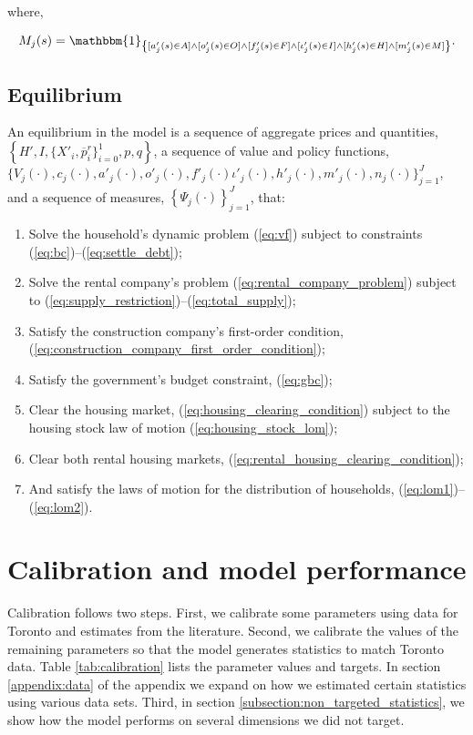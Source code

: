 \documentclass[parskip=full]{article}
\newcommand{\indicator}[1]{\mathbbm{1}_{\left\{ {#1} \right\} }}
\begin{document}
\noindent where,

\begin{align}
    M_{j}(s) = \indicator{[a'_{j}(s)\in A] \land [o'_{j}(s)\in O] \land [f'_{j}(s)\in F] \land [\iota'_{j}(s)\in I] \land [h'_{j}(s) \in H] \land [m'_{j}(s) \in M]}.\notag
\end{align}

\subsection{Equilibrium}
An equilibrium in the model is a sequence of aggregate prices and quantities, $\left\{H',I,\{X'_{i},\overline{p}^{r}_{i}\}^{1}_{i=0},p,q\right\}$, a sequence of value and policy functions, $\biggl\{V_{j}(\cdot),c_{j}(\cdot),a'_{j}(\cdot),o'_{j}(\cdot),f'_{j}(\cdot)\iota'_{j}(\cdot),h'_{j}(\cdot),m'_{j}(\cdot),n_{j}(\cdot)\biggl\}_{j=1}^J$, and a sequence of measures, $\left\{\Psi_{j}(\cdot)\right\}_{j=1}^J$, that:
\begin{enumerate}
\item Solve the household's dynamic problem (\ref{eq:vf}) subject to constraints (\ref{eq:bc})--(\ref{eq:settle_debt});
\item Solve the rental company's problem (\ref{eq:rental_company_problem}) subject to (\ref{eq:supply_restriction})--(\ref{eq:total_supply});
\item Satisfy the construction company's first-order condition, (\ref{eq:construction_company_first_order_condition});
\item Satisfy the government's budget constraint, (\ref{eq:gbc});
\item Clear the housing market,
(\ref{eq:housing_clearing_condition}) subject to the housing stock law of motion (\ref{eq:housing_stock_lom});
\item Clear both rental housing markets,
(\ref{eq:rental_housing_clearing_condition});
\item And satisfy the laws of motion for the distribution of households, (\ref{eq:lom1})--(\ref{eq:lom2}).
\end{enumerate}

\section{Calibration and model performance}\label{sec:calibration}

Calibration follows two steps. First, we calibrate some parameters using data for Toronto and estimates from the literature. Second, we calibrate the values of the remaining parameters so that the model generates statistics to match Toronto data. Table \ref{tab:calibration} lists the parameter values and targets. In section \ref{appendix:data} of the appendix we expand on how we estimated certain statistics using various data sets. Third, in section \ref{subsection:non_targeted_statistics}, we show how the model performs on several dimensions we did not target. 
\end{document}
